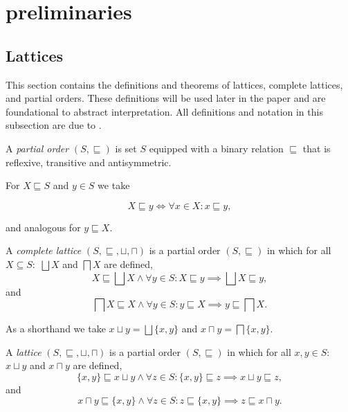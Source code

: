 
\section{preliminaries}\label{sec:preliminaries}

\subsection{Lattices}\label{subsec:lattices}
This section contains the definitions and theorems of lattices, complete lattices, and partial orders.
These definitions will be used later in the paper and are foundational to abstract interpretation.
All definitions and notation in this subsection are due to \cite{nielson_formal_2019}.

\begin{definition}
    A \emph{partial order} $(S, \sqsubseteq)$ is set $S$ equipped with a binary relation $\sqsubseteq$ that is reflexive, transitive and antisymmetric.
\end{definition}


For $X \sqsubseteq S$ and $y \in S$ we take


\begin{equation*}
    X \sqsubseteq y \iff \forall x \in X : x \sqsubseteq y,
\end{equation*}


and analogous for $y \sqsubseteq X$.


\begin{definition}
    A \emph{complete lattice} $(S, \sqsubseteq, \sqcup, \sqcap)$ is a partial order $(S, \sqsubseteq)$ in which for all $X \subseteq S:$ $\bigsqcup X$ and $\bigsqcap X$ are defined,
        \begin{equation*}
            X \sqsubseteq \bigsqcup X \land \forall y \in S : X \sqsubseteq y \implies \bigsqcup X \sqsubseteq y,
        \end{equation*}
        and
        \begin{equation*}
            \bigsqcap X \sqsubseteq X \land \forall y \in S : y \sqsubseteq X \implies y \sqsubseteq \bigsqcap X.
        \end{equation*}
\end{definition}


As a shorthand we take $x \sqcup y = \bigsqcup \{x, y\}$ and $x \sqcap y = \bigsqcap \{x, y\}$.


\begin{definition}
    A \emph{lattice} $(S, \sqsubseteq, \sqcup, \sqcap)$ is a partial order $(S, \sqsubseteq)$ in which for all $x,y \in S:$ $x \sqcup y$ and $x \sqcap y$ are defined,
        \begin{equation*}
            \{x, y\} \sqsubseteq x \sqcup y \land \forall z \in S : \{x, y\} \sqsubseteq z \implies x \sqcup y \sqsubseteq z,
        \end{equation*}
        and
        \begin{equation*}
            x \sqcap y \sqsubseteq \{x, y\} \land \forall z \in S : z \sqsubseteq \{x, y\} \implies z \sqsubseteq x \sqcap y.
        \end{equation*}
\end{definition}


